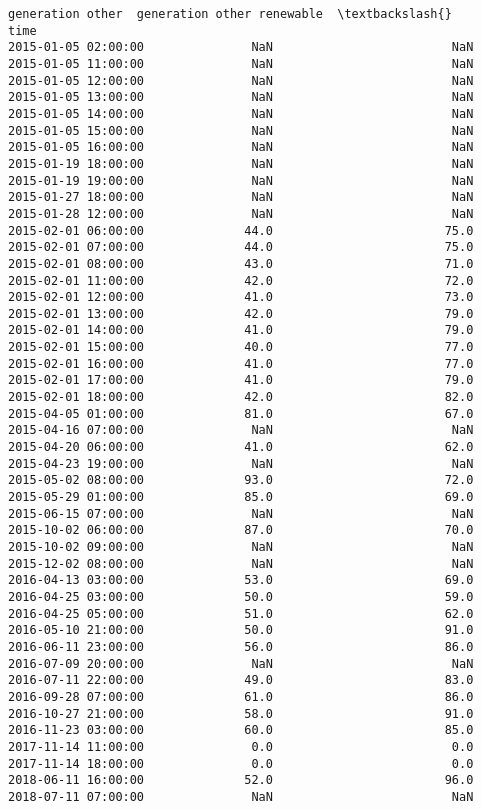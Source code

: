 \documentclass[11pt]{article}
\begin{document}
\begin{tcolorbox}[breakable, size=fbox, boxrule=.5pt, pad at break*=1mm, opacityfill=0]
\begin{Verbatim}[commandchars=\\\{\}]
                     generation other  generation other renewable  \textbackslash{}
time
2015-01-05 02:00:00               NaN                         NaN
2015-01-05 11:00:00               NaN                         NaN
2015-01-05 12:00:00               NaN                         NaN
2015-01-05 13:00:00               NaN                         NaN
2015-01-05 14:00:00               NaN                         NaN
2015-01-05 15:00:00               NaN                         NaN
2015-01-05 16:00:00               NaN                         NaN
2015-01-19 18:00:00               NaN                         NaN
2015-01-19 19:00:00               NaN                         NaN
2015-01-27 18:00:00               NaN                         NaN
2015-01-28 12:00:00               NaN                         NaN
2015-02-01 06:00:00              44.0                        75.0
2015-02-01 07:00:00              44.0                        75.0
2015-02-01 08:00:00              43.0                        71.0
2015-02-01 11:00:00              42.0                        72.0
2015-02-01 12:00:00              41.0                        73.0
2015-02-01 13:00:00              42.0                        79.0
2015-02-01 14:00:00              41.0                        79.0
2015-02-01 15:00:00              40.0                        77.0
2015-02-01 16:00:00              41.0                        77.0
2015-02-01 17:00:00              41.0                        79.0
2015-02-01 18:00:00              42.0                        82.0
2015-04-05 01:00:00              81.0                        67.0
2015-04-16 07:00:00               NaN                         NaN
2015-04-20 06:00:00              41.0                        62.0
2015-04-23 19:00:00               NaN                         NaN
2015-05-02 08:00:00              93.0                        72.0
2015-05-29 01:00:00              85.0                        69.0
2015-06-15 07:00:00               NaN                         NaN
2015-10-02 06:00:00              87.0                        70.0
2015-10-02 09:00:00               NaN                         NaN
2015-12-02 08:00:00               NaN                         NaN
2016-04-13 03:00:00              53.0                        69.0
2016-04-25 03:00:00              50.0                        59.0
2016-04-25 05:00:00              51.0                        62.0
2016-05-10 21:00:00              50.0                        91.0
2016-06-11 23:00:00              56.0                        86.0
2016-07-09 20:00:00               NaN                         NaN
2016-07-11 22:00:00              49.0                        83.0
2016-09-28 07:00:00              61.0                        86.0
2016-10-27 21:00:00              58.0                        91.0
2016-11-23 03:00:00              60.0                        85.0
2017-11-14 11:00:00               0.0                         0.0
2017-11-14 18:00:00               0.0                         0.0
2018-06-11 16:00:00              52.0                        96.0
2018-07-11 07:00:00               NaN                         NaN


\end{Verbatim}
\end{tcolorbox}
\end{document}
